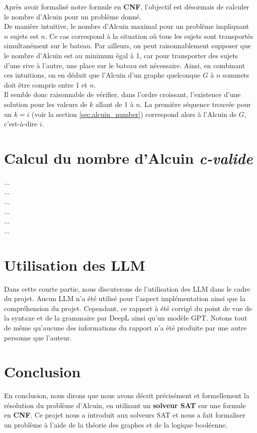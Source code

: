 \documentclass{article}
\begin{document}
\noindent Après avoir formalisé notre formule en \textbf{CNF}, l'objectif est désormais de calculer le nombre d'Alcuin pour un problème donné. \\

\noindent De manière intuitive, le nombre d'Alcuin maximal pour un problème impliquant \( n \) sujets est \( n \). Ce cas correspond à la situation où tous les sujets sont transportés simultanément sur le bateau. Par ailleurs, on peut raisonnablement supposer que le nombre d'Alcuin est au minimum égal à 1, car pour transporter des sujets d'une rive à l'autre, une place sur le bateau est nécessaire. Ainsi, en combinant ces intuitions, on en déduit que l'Alcuin d'un graphe quelconque \( G \) à \( n \) sommets doit être compris entre 1 et \( n \). \\

\noindent Il semble donc raisonnable de vérifier, dans l'ordre croissant, l'existence d'une solution pour les valeurs de \( k \) allant de 1 à \( n \). La première séquence trouvée pour un \( k = i \) (voir la section \ref{sec:alcuin_number}) correspond alors à l'Alcuin de \( G \), c'est-à-dire \( i \).

\section{Calcul du nombre d'Alcuin \textit{c-valide}}
\label{sec:cvalid}

\noindent ... \\

\noindent ... \\

\noindent ... \\

\noindent ... \\

\noindent ... \\

\noindent ... \\

\section{Utilisation des LLM}

\noindent Dans cette courte partie, nous discuterons de l'utilisation des LLM dans le cadre du projet. Aucun LLM n'a été utilisé pour l'aspect implémentation ainsi que la compréhension du projet. Cependant, ce rapport à été corrigé du point de vue de la syntaxe et de la grammaire par DeepL ainsi qu'un modèle GPT. Notons tout de même qu'aucune des informations du rapport n'a été produite par une autre personne que l'auteur.

\section{Conclusion}

\noindent En conclusion, nous dirons que nous avons décrit précisément et formellement la résolution du problème d'Alcuin, en utilisant un \textbf{solveur SAT} sur une formule en \textbf{CNF}. Ce projet nous a introduit aux solveurs SAT et nous a fait formaliser un problème à l'aide de la théorie des graphes et de la logique booléenne.
\end{document}
